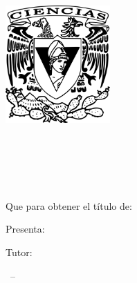 
  
\begin{titlepage}
\AddToShipoutPicture*{\BackgroundPic}



\begin{addmargin}[-1cm]{-3cm}
  \begin{center}
        \large

       \vspace{2cm}
        \includegraphics[width=4.0cm]{gfx/Escudo-FCIENCIAS.pdf} \\ \medskip
        \begingroup
            \spacedallcaps{\myUni} \\ \bigskip
        \endgroup
        
        \vfil
        
        \begingroup
            \spacedallcaps{\myFaculty} \\ \bigskip
        \endgroup
        
        \hfill

        \vfill
        
        \begingroup
            \color{CTtitle}\spacedallcaps{\myTitle} \\ \bigskip
        \endgroup
        \vfill
        \\[1.2cm]
        
        Que para obtener el título de: \\ \bigskip
        \myDegree

        \vspace{1.4cm}
        Presenta: \\ \bigskip
        \large{\spacedlowsmallcaps{\myName}}

        \vfill

        Tutor: \\ \bigskip
        \mySupervisor

      
        \vfill
        \myTime\ -- \myVersion

        \vfill

        \end{center}

\end{addmargin}
\end{titlepage}
